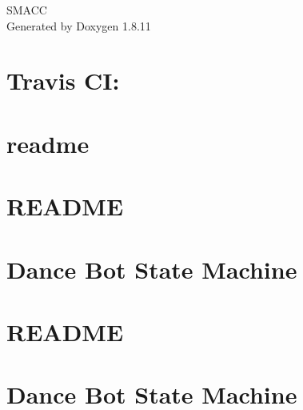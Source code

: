 \documentclass[twoside]{book}
\newcommand{\+}{\discretionary{\mbox{\scriptsize$\hookleftarrow$}}{}{}}
\newcommand{\clearemptydoublepage}{%
  \newpage{\pagestyle{empty}\cleardoublepage}%
}
\begin{document}
\hypersetup{pageanchor=false,
             bookmarksnumbered=true,
             pdfencoding=unicode
            }
\begin{titlepage}
\vspace*{7cm}
\begin{center}%
{\Large S\+M\+A\+CC }\\
\vspace*{1cm}
{\large Generated by Doxygen 1.8.11}\\
\end{center}
\end{titlepage}
\clearemptydoublepage
\tableofcontents
\clearemptydoublepage
{}
\hypersetup{pageanchor=true}

\chapter{Travis CI\+:}
\label{md_README}
\hypertarget{md_README}{}

\chapter{readme}
\label{md_smacc_diagnostics_readme}
\hypertarget{md_smacc_diagnostics_readme}{}

\chapter{R\+E\+A\+D\+ME}
\label{md_smacc_sm_reference_library_sm_atomic_README}
\hypertarget{md_smacc_sm_reference_library_sm_atomic_README}{}

\chapter{Dance Bot State Machine}
\label{md_smacc_sm_reference_library_sm_dance_bot_launch_readme}
\hypertarget{md_smacc_sm_reference_library_sm_dance_bot_launch_readme}{}

\chapter{R\+E\+A\+D\+ME}
\label{md_smacc_sm_reference_library_sm_dance_bot_README}
\hypertarget{md_smacc_sm_reference_library_sm_dance_bot_README}{}

\chapter{Dance Bot State Machine}
\label{md_smacc_sm_reference_library_sm_dance_bot_2_launch_readme}
\hypertarget{md_smacc_sm_reference_library_sm_dance_bot_2_launch_readme}{}

\end{document}
